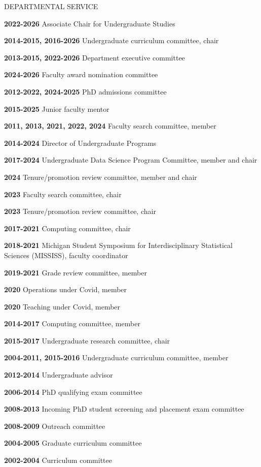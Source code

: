
\begin{mylist}{DEPARTMENTAL SERVICE}

\item{\bf 2022-2026 } Associate Chair for Undergraduate Studies
\item{\bf 2014-2015, 2016-2026 } Undergraduate curriculum committee, chair
\item{\bf 2013-2015, 2022-2026 } Department executive committee
\item{\bf 2024-2026 } Faculty award nomination committee
\item{\bf 2012-2022, 2024-2025 } PhD admissions committee
\item{\bf 2015-2025 } Junior faculty mentor
\item{\bf 2011, 2013, 2021, 2022, 2024 } Faculty search committee, member
\item{\bf 2014-2024 } Director of Undergraduate Programs
\item{\bf 2017-2024 } Undergraduate Data Science Program Committee, member and chair
\item{\bf 2024 } Tenure/promotion review committee, member and chair
\item{\bf 2023 } Faculty search committee, chair
\item{\bf 2023 } Tenure/promotion review committee, chair 
\item{\bf 2017-2021 } Computing committee, chair
\item{\bf 2018-2021} Michigan Student Symposium for Interdisciplinary Statistical Sciences (MISSISS), faculty coordinator
\item{\bf 2019-2021 } Grade review committee, member  
\item{\bf 2020 } Operations under Covid, member
\item{\bf 2020 } Teaching under Covid, member
\item{\bf 2014-2017 } Computing committee, member
\item{\bf 2015-2017 } Undergraduate research committee, chair
\item{\bf 2004-2011, 2015-2016 } Undergraduate curriculum committee, member
\item{\bf 2012-2014 } Undergraduate advisor
\item{\bf 2006-2014 } PhD qualifying exam committee
\item{\bf 2008-2013 } Incoming PhD student screening and placement exam committee
\item{\bf 2008-2009 } Outreach committee
\item{\bf 2004-2005 } Graduate curriculum committee
\item{\bf 2002-2004 } Curriculum committee 
\end{mylist}

